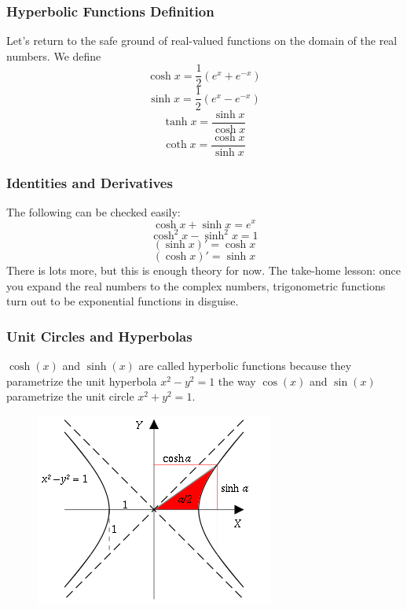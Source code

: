 \documentclass[xcolor=dvipsnames]{beamer}
\begin{document}
\begin{frame}
  \frametitle{Hyperbolic Functions Definition}
Let's return to the safe ground of real-valued functions on the
domain of the real numbers. We define
\begin{equation}
  \label{eq:gomedaek}
  \cosh{}x=\frac{1}{2}\left(e^{x}+e^{-x}\right)
\end{equation}
\begin{equation}
  \label{eq:teeyavah}
  \sinh{}x=\frac{1}{2}\left(e^{x}-e^{-x}\right)
\end{equation}
\begin{equation}
  \label{eq:oeyuzahc}
  \tanh{}x=\frac{\sinh{}x}{\cosh{}x}
\end{equation}
\begin{equation}
  \label{eq:ainguchu}
  \coth{}x=\frac{\cosh{}x}{\sinh{}x}
\end{equation}
\end{frame}

\begin{frame}
  \frametitle{Identities and Derivatives}
The following can be checked easily:
\begin{equation}
  \label{eq:wahquain}
  \cosh{}x+\sinh{}x=e^{x}
\end{equation}
\begin{equation}
  \label{eq:thaevuan}
  \cosh^{2}x-\sinh^{2}x=1
\end{equation}
\begin{equation}
  \label{eq:gahngoip}
  (\sinh{}x)'=\cosh{}x
\end{equation}
\begin{equation}
  \label{eq:shahsuuw}
  (\cosh{}x)'=\sinh{}x
\end{equation}
There is lots more, but this is enough theory for now. The take-home
lesson: once you expand the real numbers to the complex numbers,
trigonometric functions turn out to be exponential functions in disguise.
\end{frame}

\begin{frame}
  \frametitle{Unit Circles and Hyperbolas}
$\cosh(x)$ and $\sinh(x)$ are called \alert{hyperbolic} functions
because they parametrize the unit hyperbola $x^{2}-y^{2}=1 $ the way
$\cos(x)$ and $\sin(x)$ parametrize the unit circle $x^{2}+y^{2}=1$.
\begin{figure}[h]
\includegraphics[scale=.5]{./diagrams/hyper.png}
\end{figure}
\end{frame}
\end{document}
